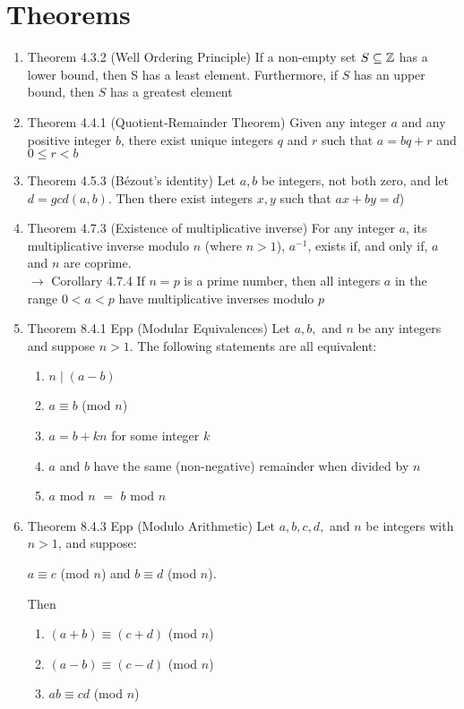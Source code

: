 \documentclass[a4paper]{article}
\begin{document}
\section{Theorems}
\begin{enumerate}
	\item[] Theorem 4.3.2 (Well Ordering Principle) If a non-empty set $S \subseteq \mathbb{Z}$ has a lower bound, then S has a least element. Furthermore, if $S$ has an upper bound, then $S$ has a greatest element
	\item[] Theorem 4.4.1 (Quotient-Remainder Theorem) Given any integer $a$ and any positive integer $b$, there exist unique integers $q$ and $r$ such that $a=bq+r$ and $0\le r < b$
	\item[] Theorem 4.5.3 (Bézout's identity) Let $a, b$ be integers, not both zero, and let $d=gcd(a,b)$. Then there exist integers $x,y$ such that $ax+by=d$)
	\item[] Theorem 4.7.3 (Existence of multiplicative inverse) For any integer $a$, its multiplicative inverse modulo $n$ (where $n>1$), $a^{-1}$, exists if, and only if, $a$ and $n$ are coprime.\\
	$\rightarrow$ Corollary 4.7.4 If $n=p$ is a prime number, then all integers $a$ in the range $0<a<p$ have multiplicative inverses modulo $p$
	\item[] Theorem 8.4.1 Epp (Modular Equivalences) Let $a, b,$ and $n$ be any integers and suppose $n>1$. The following statements are all equivalent:
	\begin{enumerate}
		\item $n\mid (a-b)$
		\item $a\equiv b$ (mod $n$)
		\item $a=b+kn$ for some integer $k$
		\item $a$ and $b$ have the same (non-negative) remainder when divided by $n$
		\item $a$ mod $n$ $=$ $b$ mod $n$
	\end{enumerate}
	\item[] Theorem 8.4.3 Epp (Modulo Arithmetic) Let $a, b, c, d,$ and $n$ be integers with $n>1$, and suppose:
	\begin{center}
		$a \equiv c$ (mod $n$) and $b \equiv d$ (mod $n$).
	\end{center}
	Then
	\begin{enumerate}
		\item $(a+b) \equiv (c+d)$ (mod $n$)
		\item $(a-b) \equiv (c-d)$ (mod $n$)
		\item $ab\equiv cd$ (mod $n$)

\end{enumerate}
\end{enumerate}
\end{document}
